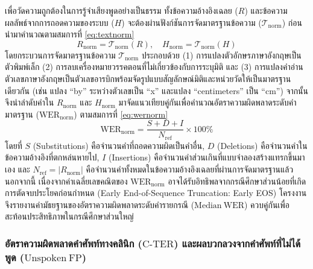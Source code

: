 เพื่อวัดความถูกต้องในการรู้จำเสียงพูดอย่างเป็นธรรม ทั้งข้อความอ้างอิงเฉลย ($R$) และข้อความผลลัพธ์จากการถอดความของระบบ ($H$) จะต้องผ่านฟังก์ชันการจัดมาตรฐานข้อความ ($\mathcal{T}_{\mathrm{norm}}$) ก่อนนำมาคำนวณตามสมการที่ \eqref{eq:textnorm}
\begin{equation}
R_{\mathrm{norm}} = \mathcal{T}_{\mathrm{norm}}(R), \quad H_{\mathrm{norm}} = \mathcal{T}_{\mathrm{norm}}(H)
\label{eq:textnorm}
\end{equation}
โดยกระบวนการจัดมาตรฐานข้อความ $\mathcal{T}_{\mathrm{norm}}$ ประกอบด้วย (1) การแปลงตัวอักษรภาษาอังกฤษเป็นตัวพิมพ์เล็ก (2) การลบเครื่องหมายวรรคตอนที่ไม่เกี่ยวข้องกับการระบุมิติ และ (3) การแปลงคำอ่านตัวเลขภาษาอังกฤษเป็นตัวเลขอารบิกพร้อมจัดรูปแบบสัญลักษณ์มิติและหน่วยวัดให้เป็นมาตรฐานเดียวกัน (เช่น แปลง ``by'' ระหว่างตัวเลขเป็น ``x'' และแปลง ``centimeters'' เป็น ``cm'') จากนั้นจึงนำลำดับคำใน $R_{\mathrm{norm}}$ และ $H_{\mathrm{norm}}$ มาจัดแนวเทียบคู่กันเพื่อคำนวณอัตราความผิดพลาดระดับคำมาตรฐาน ($\mathrm{WER}_{\mathrm{norm}}$) ตามสมการที่ \eqref{eq:wernorm}
\begin{equation}
\mathrm{WER}_{\mathrm{norm}} = \frac{S + D + I}{N_{\mathrm{ref}}} \times 100\%
\label{eq:wernorm}
\end{equation}
โดยที่ $S$ (Substitutions) คือจำนวนคำที่ถอดความผิดเป็นคำอื่น, $D$ (Deletions) คือจำนวนคำในข้อความอ้างอิงที่ตกหล่นหายไป, $I$ (Insertions) คือจำนวนคำส่วนเกินที่แบบจำลองสร้างแทรกขึ้นมาเอง และ $N_{\mathrm{ref}} = |R_{\mathrm{norm}}|$ คือจำนวนคำทั้งหมดในข้อความอ้างอิงเฉลยที่ผ่านการจัดมาตรฐานแล้ว นอกจากนี้ เนื่องจากค่าเฉลี่ยเลขคณิตของ $\mathrm{WER}_{\mathrm{norm}}$ อาจได้รับอิทธิพลจากกรณีศึกษาส่วนน้อยที่เกิดการตัดจบประโยคก่อนกำหนด (Early End-of-Sequence Truncation: Early EOS) โครงงานจึงรายงานค่ามัธยฐานของอัตราความผิดพลาดระดับคำรายกรณี ($\mathrm{Median\ WER}$) ควบคู่กันเพื่อสะท้อนประสิทธิภาพในกรณีศึกษาส่วนใหญ่

\subsubsection{อัตราความผิดพลาดคำศัพท์ทางคลินิก ($\mathrm{C\text{-}TER}$) และผลบวกลวงจากคำศัพท์ที่ไม่ได้พูด ($\mathrm{Unspoken\ FP}$)}

